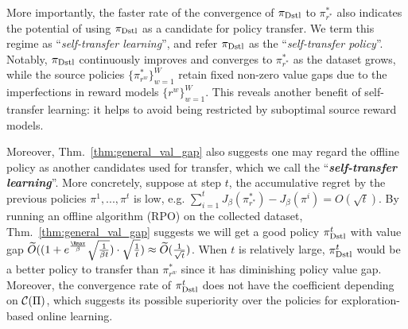 More importantly, the faster rate of the convergence of $\pi_{\text{Dstl}}$ to $\pi^*_{r^*}$ also indicates the potential of using $\pi_{\text{Dstl}}$ as a candidate for policy transfer.
%
We term this regime as ``\emph{self-transfer learning}'', and refer $\pi_{\text{Dstl}}$ as the ``\emph{self-transfer policy}''.
Notably, $\pi_{\text{Dstl}}$ continuously improves and converges to $\pi^*_{r^*}$ as the dataset grows, while the source policies $\{\pi^*_{r^w}\}_{w=1}^W$ retain fixed non-zero value gaps due to the imperfections in reward models $\{r^w\}_{w=1}^W$.
This reveals another benefit of self-transfer learning: it helps to avoid being restricted by suboptimal source reward models.

%
%


%
%
%
%
%

%
%
%
%
%
%

%
%
%
%
%

%
%


%
%
%
%

%

%

%


%
%
%

%
%

%
%



%
%
%
%

%

\iffalse
Moreover, Thm.~\ref{thm:general_val_gap} also suggests one may regard the offline policy as another candidates used for transfer, which we call the ``\emph{\textbf{self-transfer learning}}''.
More concretely, suppose at step $t$, the accumulative regret by the previous policies $\pi^1,...,\pi^t$ is low, e.g. $\sum_{i=1}^t J_\beta(\pi^*_{r^*}) - J_\beta(\pi^i) = O(\sqrt{t})$. 
By running an offline algorithm (RPO) on the collected dataset, Thm.~\ref{thm:general_val_gap} suggests we will get a good policy $\pi^t_{\text{Dstl}}$ with value gap $\tilde{O}((1 + e^{\frac{{\Rmax}}{\beta}}\sqrt{\frac{1}{\beta t}})\cdot \sqrt{\frac{1}{t}}) \approx \tilde{O}(\frac{1}{\sqrt{t}})$.
When $t$ is relatively large, $\pi^t_{\text{Dstl}}$ would be a better policy to transfer than $\pi^*_{r^w}$ since it has diminishing policy value gap.
Moreover, the convergence rate of $\pi^t_{\text{Dstl}}$ does not have the coefficient depending on $\mathcal{C}(\Pi)$, which suggests its possible superiority over the policies for exploration-based online learning.



